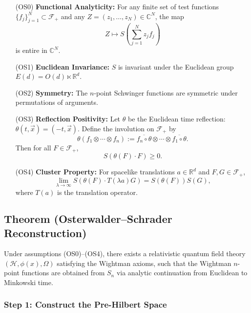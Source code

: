 \documentclass{article}
\newcommand{\1}{\mathbbm{1}}
\theoremstyle{plain}
\theoremstyle{definition}
\numberwithin{equation}{section}
\begin{document}
\begin{enumerate}
  \item[(OS0)] \textbf{Functional Analyticity:}  
  For any finite set of test functions $\{f_j\}_{j=1}^N \subset \mathcal{F}_+$ and any $Z = (z_1, \dots, z_N) \in \mathbb{C}^N$, the map
  \[
  Z \mapsto S\left( \sum_{j=1}^N z_j f_j \right)
  \]
  is entire in $\mathbb{C}^N$.

  \item[(OS1)] \textbf{Euclidean Invariance:}  
  $S$ is invariant under the Euclidean group $E(d) = O(d) \ltimes \mathbb{R}^d$.

  \item[(OS2)] \textbf{Symmetry:}  
  The $n$-point Schwinger functions are symmetric under permutations of arguments.

  \item[(OS3)] \textbf{Reflection Positivity:}  
  Let $\theta$ be the Euclidean time reflection: $\theta(t, \vec{x}) = (-t, \vec{x})$. Define the involution on $\mathcal{F}_+$ by
  \[
  \theta(f_1 \otimes \cdots \otimes f_n) := \overline{f_n \circ \theta} \otimes \cdots \otimes \overline{f_1 \circ \theta}.
  \]
  Then for all $F \in \mathcal{F}_+$,
  \[
  S(\theta(F) \cdot F) \geq 0.
  \]

  \item[(OS4)] \textbf{Cluster Property:}  
  For spacelike translations $a \in \mathbb{R}^d$ and $F, G \in \mathcal{F}_+$,
  \[
  \lim_{\lambda \to \infty} S(\theta(F) \cdot T(\lambda a) G) = S(\theta(F)) S(G),
  \]
  where $T(a)$ is the translation operator.
\end{enumerate}

\subsection*{Theorem (Osterwalder--Schrader Reconstruction)}

Under assumptions (OS0)--(OS4), there exists a relativistic quantum field theory $(\mathcal{H}, \phi(x), \Omega)$ satisfying the Wightman axioms, such that the Wightman $n$-point functions are obtained from $S_n$ via analytic continuation from Euclidean to Minkowski time.

\subsubsection*{Step 1: Construct the Pre-Hilbert Space}
\end{document}
